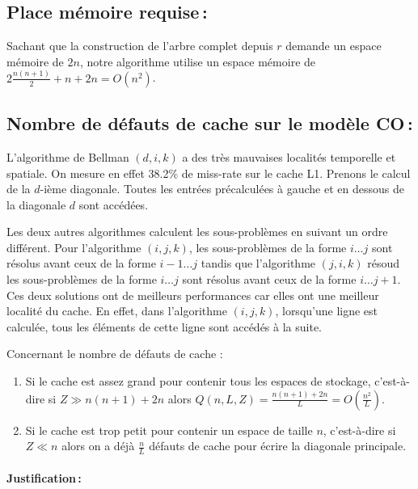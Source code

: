 \documentclass[a4paper, 10pt, french]{article}
\begin{document}
\subsection{Place mémoire requise\,: }
Sachant que la construction de l'arbre complet depuis $r$ demande un espace mémoire de $2n$, notre algorithme utilise un espace mémoire de $2\frac{n(n+1)}{2} + n + 2n = O(n^2)$. \par\leavevmode\par

\subsection{Nombre de défauts de cache sur le modèle CO\,: }

L'algorithme de Bellman $(d, i, k)$ a des très mauvaises localités temporelle et spatiale. On mesure en effet 38.2\% de miss-rate sur le cache L1. Prenons le calcul de la $d$-ième diagonale. Toutes les entrées précalculées à gauche et en dessous de la diagonale $d$ sont accédées.

Les deux autres algorithmes calculent les sous-problèmes en suivant un ordre différent. Pour l'algorithme $(i, j, k)$, les sous-problèmes de la forme $i \ldots j$ sont résolus avant ceux de la forme $i - 1 \ldots j$ tandis que l'algorithme $(j, i, k)$ résoud les sous-problèmes de la forme $i \ldots j$ sont résolus avant ceux de la forme $i \ldots j + 1$. Ces deux solutions ont de meilleurs performances car elles ont une meilleur localité du cache. En effet, dans l'algorithme $(i, j, k)$, lorsqu'une ligne est calculée, tous les éléments de cette ligne sont accédés à la suite.

Concernant le nombre de défauts de cache :
\begin{enumerate}
  \item Si le cache est assez grand pour contenir tous les espaces de stockage, c'est-à-dire si $Z \gg n(n+1) + 2n$ alors $Q(n, L, Z) = \frac{n(n+1) + 2n}{L} = O(\frac{n^2}{L})$.
  \item Si le cache est trop petit pour contenir un espace de taille $n$, c'est-à-dire si $Z \ll n$ alors on a déjà $\frac{n}{L}$ défauts de cache pour écrire la diagonale principale.
\end{enumerate}
\paragraph{Justification\,: }


\end{document}
